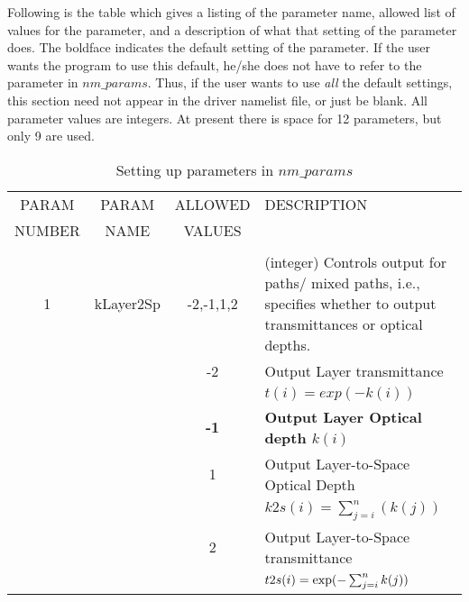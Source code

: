 \documentclass[12pt]{article}
\newlength{\colwidth}
\newlength{\colwidthshort}
\begin{document}
Following is the table which gives a listing of the parameter name,  
allowed list of values for the parameter, and a description of what that 
setting of the parameter does.  The boldface indicates the default setting 
of the parameter.  If the user wants the
program to use this default, he/she does not have to refer to the
parameter in $nm\_params$.  Thus, if the user wants to use {\em all} the
default settings, this section need not appear in the driver namelist
file, or just be blank.  All parameter values are integers. At present there is
space for 12 parameters, but only 9 are used.

\begin{small}
\begin{longtable}{|c|c|c|p{\colwidthshort}|}
\caption{Setting up parameters in $nm\_params$}\\
\hline
PARAM  & PARAM & ALLOWED & DESCRIPTION\\
NUMBER & NAME  & VALUES  & \\
   &              &     & \\
\hline
1  & {\sf kLayer2Sp} & -2,-1,1,2 & (integer) Controls output for 
           paths/ mixed paths, i.e., specifies whether to output 
           transmittances or optical depths.\\
   &           &  -2  &    Output Layer transmittance  \\
   &           &      &    $t(i)=exp(-k(i))$\\
   &           & {\bf -1} & {\bf Output Layer Optical depth    $k(i)$}\\
   &           &    1 &    Output Layer-to-Space Optical Depth   \\
   &           &      &    $k2s(i)=\sum_{j=i}^{n}(k(j))$\\
   &           &    2 &    Output Layer-to-Space transmittance   \\
   &           &      &   $t2s(i)=\hbox{exp}(-\sum_{j=i}^{n}k(j))$\\ \hline


\end{longtable}
\end{small}
\end{document}
